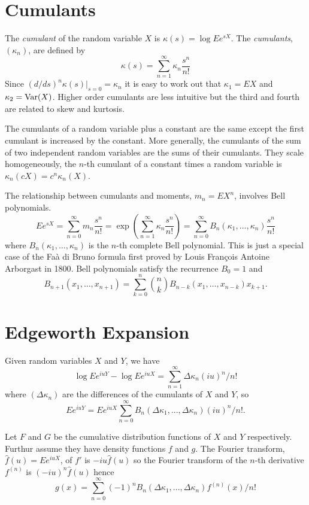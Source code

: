 \documentclass[11pt]{article}
\newcommand{\Var}{\mathop{\rm{Var}}}
\theoremstyle{definition}
\begin{document}
\section{Cumulants}

The {\em cumulant} of the random variable \(X\)
is \(\kappa(s) = \log Ee^{sX}\).
The {\em cumulants}, \((\kappa_n)\),
are defined by
\[
\kappa(s) = \sum_{n=1}^\infty \kappa_n \frac{s^n}{n!}
\]
Since \((d/ds)^n\kappa(s)|_{s = 0} = \kappa_n\) it is easy to
work out that
\(\kappa_1 = EX\) and \(\kappa_2 = \Var(X)\). Higher order
cumulants are less intuitive but the third and fourth are
related to skew and kurtosis.

The cumulants of a random variable plus a constant are the 
same except the first cumulant is increased by the constant.
More generally, the cumulants of the sum of two independent 
random variables are the sums of their cumulants.
They scale homogeneously, the \(n\)-th cumulant of a constant
times a random variable is
\(\kappa_n(cX) = c^n\kappa_n(X)\).

The relationship between cumulants and moments, \(m_n = EX^n\),
involves Bell
polynomials\cite{Bel1934}.
\[
Ee^{sX} = \sum_{n=0}^\infty m_n \frac{s^n}{n!}
 = \exp(\sum_{n=1}^\infty \kappa_n \frac{s^n}{n!})
= \sum_{n=0}^\infty B_n(\kappa_1,\dots,\kappa_n) \frac{s^n}{n!}
\]
where \(B_n(\kappa_1,\dots,\kappa_n)\) is the \(n\)-th complete
Bell polynomial.
This is just a special case of the
Fa\`a di Bruno formula first proved by Louis Fran\c{c}ois Antoine
Arborgast in 1800\cite{Arb1800}.
Bell polynomials satisfy the recurrence \cite{Com1974} \(B_0 = 1\) and
\[
B_{n+1}(x_1,\dots,x_{n+1}) = \sum_{k=0}^n \binom{n}{k}
B_{n - k}(x_1,\dots, x_{n - k}) x_{k+1}.
\]

\section{Edgeworth Expansion}
Given random
variables \(X\) and \(Y\), we have
\[\log E e^{iuY} - \log E e^{iuX} = \sum_{n=1}^\infty \Delta\kappa_n (iu)^n/n!\]
where \((\Delta\kappa_n)\) are the differences of the cumulants 
of \(X\) and \(Y\), so
\[
Ee^{iuY} = Ee^{iuX}\sum_{n=0}^\infty B_n(\Delta\kappa_1,...,\Delta\kappa_n)(iu)^n/n!.
\]

Let \(F\) and \(G\) be the cumulative distribution functions of
\(X\) and \(Y\) respectively. Furthur assume they have density
functions \(f\) and \(g\).
The Fourier transform, \(\hat{f}(u) = Ee^{iuX}\),
of \(f'\) is \(-iu \hat f(u)\) so
the Fourier transform of the \(n\)-th derivative
\(f^{(n)}\) is \((-iu)^n\hat f(u)\) hence
\[
	g(x) = \sum_{n=0}^\infty (-1)^n B_n(\Delta\kappa_1,...,\Delta\kappa_n)
	f^{(n)}(x)/n!
\]
\end{document}
